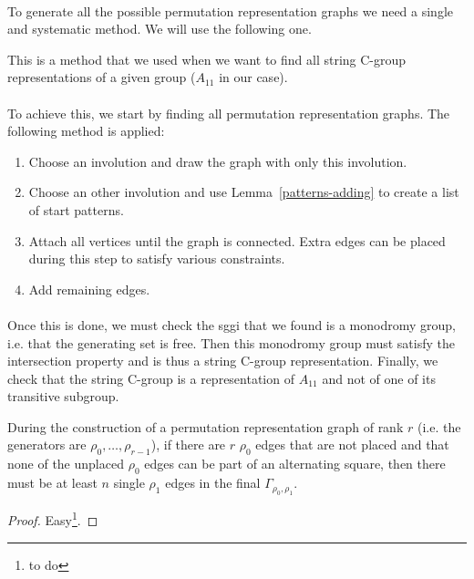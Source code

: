 \paragraph{}
To generate all the possible permutation representation graphs we need a single and systematic method. We will use the following one.

\begin{method}
  \label{method}
  This is a method that we used when we want to find all string C-group representations of a given group ($A_{11}$ in our case).

  \paragraph{}
  To achieve this, we start by finding all permutation representation graphs. The following method is applied:

  \begin{enumerate}
    \item Choose an involution and draw the graph with only this involution.
    \item Choose an other involution and use Lemma~\ref{patterns-adding} to create a list of start patterns.
    \item Attach all vertices until the graph is connected. Extra edges can be placed during this step to satisfy various constraints.
    \item Add remaining edges.
  \end{enumerate}

  \paragraph{}
  Once this is done, we must check the sggi that we found is a monodromy group, i.e. that the generating set is free. Then this monodromy group must satisfy the intersection property and is thus a string C-group representation. Finally, we check that the string C-group is a representation of $A_{11}$ and not of one of its transitive subgroup.

\end{method}

\begin{lemma}
  \label{rho0atEnd}
  During the construction of a permutation representation graph of rank $r$ (i.e. the generators are $\rho_0, \dots, \rho_{r-1}$), if there are $r$ $\rho_0$ edges that are not placed and that none of the unplaced $\rho_0$ edges can be part of an alternating square, then there must be at least $n$ single $\rho_1$ edges in the final $\Gamma_{\rho_0, \rho_1}$.
\end{lemma}

\begin{proof}
  Easy\footnote{to do}.
\end{proof}
